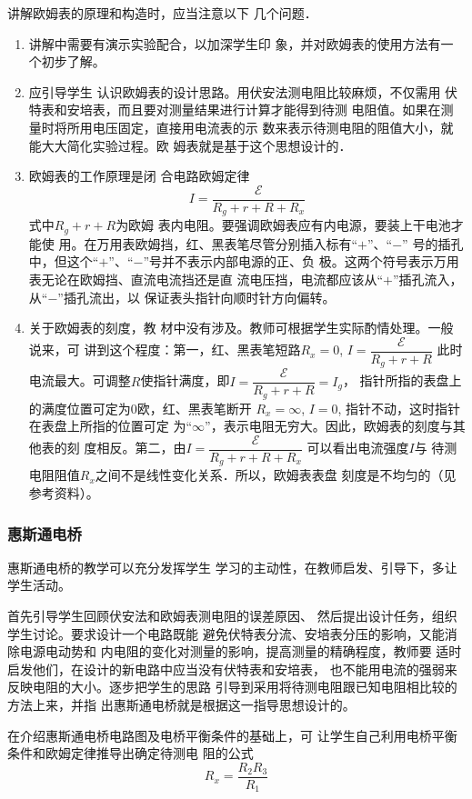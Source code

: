 讲解欧姆表的原理和构造时，应当注意以下
几个问题．
\begin{enumerate}
\item 讲解中需要有演示实验配合，以加深学生印
象，并对欧姆表的使用方法有一个初步了解。    
\item 应引导学生
认识欧姆表的设计思路。用伏安法测电阻比较麻烦，不仅需用
伏特表和安培表，而且要对测量结果进行计算才能得到待测
电阻值。如果在测量时将所用电压固定，直接用电流表的示
数来表示待测电阻的阻值大小，就能大大简化实验过程。欧
姆表就是基于这个思想设计的．   
 \item 欧姆表的工作原理是闭
合电路欧姆定律$$I=\dfrac{\mathcal{E}}{R_g+r+R+R_x}$$
式中$R_g+r+R$为欧姆
表内电阻。要强调欧姆表应有内电源，要装上干电池才能使
用。在万用表欧姆挡，红、黑表笔尽管分别插入标有“$+$”、“$-$”
号的插孔中，但这个“$+$”、“$-$”号并不表示内部电源的正、负
极。这两个符号表示万用表无论在欧姆挡、直流电流挡还是直
流电压挡，电流都应该从“$+$”插孔流入，从“$-$”插孔流出，以
保证表头指针向顺时针方向偏转。
\item 关于欧姆表的刻度，教
材中没有涉及。教师可根据学生实际酌情处理。一般说来，可
讲到这个程度：第一，红、黑表笔短路$R_x=0$, $I=\dfrac{\mathcal{E}}{R_g+r+R}$
此时电流最大。可调整$R$使指针满度，即$I=\dfrac{\mathcal{E}}{R_g+r+R}=I_g$，
指针所指的表盘上的满度位置可定为0欧，红、黑表笔断开
$R_x=\infty$, $I=0$, 指针不动，这时指针在表盘上所指的位置可定
为“$\infty$”，表示电阻无穷大。因此，欧姆表的刻度与其他表的刻
度相反。第二，由$I=\dfrac{\mathcal{E}}{R_g+r+R+R_x}$
可以看出电流强度$I$与
待测电阻阻值$R_x$之间不是线性变化关系．所以，欧姆表表盘
刻度是不均匀的（见参考资料）。
\end{enumerate}

\subsubsection{惠斯通电桥}

惠斯通电桥的教学可以充分发挥学生
学习的主动性，在教师启发、引导下，多让学生活动。

首先引导学生回顾伏安法和欧姆表测电阻的误差原因、
然后提出设计任务，组织学生讨论。要求设计一个电路既能
避免伏特表分流、安培表分压的影响，又能消除电源电动势和
内电阻的变化对测量的影响，提高测量的精确程度，教师要
适时启发他们，在设计的新电路中应当没有伏特表和安培表，
也不能用电流的强弱来反映电阻的大小。逐步把学生的思路
引导到采用将待测电阻跟已知电阻相比较的方法上来，并指
出惠斯通电桥就是根据这一指导思想设计的。

在介绍惠斯通电桥电路图及电桥平衡条件的基础上，可
让学生自己利用电桥平衡条件和欧姆定律推导出确定待测电
阻的公式
\[R_x=\frac{R_2R_3}{R_1}\]

